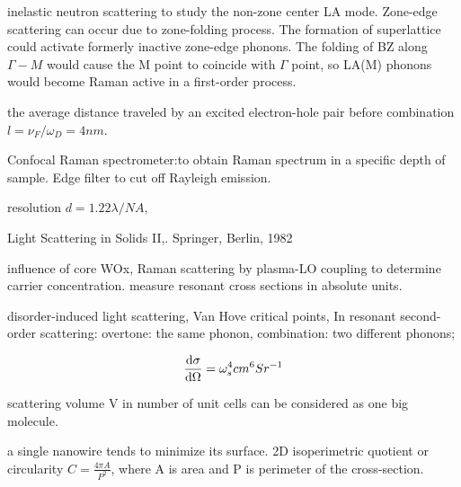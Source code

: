 inelastic neutron scattering to study the non-zone center LA mode. Zone-edge scattering can occur due to zone-folding process. The formation of superlattice could activate formerly inactive zone-edge phonons. The folding of BZ along $\Gamma-M$ would cause the M point to coincide with $\Gamma$ point, so LA(M) phonons would become Raman active in a first-order process.

the average distance traveled by an excited electron-hole pair before combination $l=\nu_F/\omega_D=4nm$.

Confocal Raman spectrometer:to obtain Raman spectrum in a specific depth of sample. Edge filter to cut off Rayleigh emission.

resolution $d= 1.22 \lambda/NA$,

Light Scattering in Solids II,. Springer, Berlin, 1982

influence of core WOx, Raman scattering by plasma-LO coupling to determine carrier concentration. measure resonant cross sections in absolute units.

disorder-induced light scattering, Van Hove critical points,
In resonant second-order scattering:
overtone: the same phonon,
combination: two different phonons;

\[
\frac{\mathrm{d}\sigma}{\mathrm{d}\Omega}= \omega_s^4 cm^6 Sr^{-1}
\]

scattering volume V in number of unit cells can be considered as one big molecule.

a single nanowire tends to minimize its surface. 2D isoperimetric quotient or circularity $C= \frac{4\pi A}{P^2}$, where A is area and P is perimeter of the cross-section.


